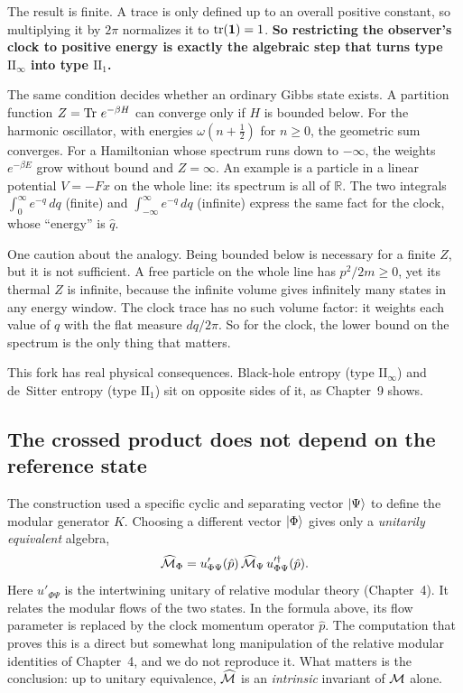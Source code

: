 The result is finite. A trace is only defined up to an overall positive constant, so multiplying it by $2\pi$
normalizes it to $\operatorname{tr}(\mathbf{1})=1$. \textbf{So restricting the observer's clock to positive energy is exactly the
algebraic step that turns type $\mathrm{II}_\infty$ into type $\mathrm{II}_1$.}

The same condition decides whether an ordinary Gibbs state exists. A partition function $Z=\operatorname{Tr}\,e^{-\beta H}$
can converge only if $H$ is bounded below. For the harmonic oscillator, with energies $\omega(n+\tfrac12)$ for
$n\ge0$, the geometric sum converges. For a Hamiltonian whose spectrum runs down to $-\infty$, the weights
$e^{-\beta E}$ grow without bound and $Z=\infty$. An example is a particle in a linear potential $V=-Fx$ on the
whole line: its spectrum is all of $\mathbb R$. The two integrals $\int_0^\infty e^{-q}\,dq$ (finite) and
$\int_{-\infty}^\infty e^{-q}\,dq$ (infinite) express the same fact for the clock, whose ``energy'' is $\hat q$.

One caution about the analogy. Being bounded below is necessary for a finite $Z$, but it is not sufficient. A
free particle on the whole line has $p^2/2m\ge0$, yet its thermal $Z$ is infinite, because the infinite volume
gives infinitely many states in any energy window. The clock trace has no such volume factor: it weights each
value of $q$ with the flat measure $dq/2\pi$. So for the clock, the lower bound on the spectrum is the only
thing that matters.

This fork has real physical consequences. Black-hole entropy (type $\mathrm{II}_\infty$) and de~Sitter entropy
(type $\mathrm{II}_1$) sit on opposite sides of it, as Chapter~9 shows.

\subsection*{The crossed product does not depend on the reference state}

The construction used a specific cyclic and separating vector $\ket\Psi$ to define the modular generator $K$.
Choosing a different vector $\ket\Phi$ gives only a \emph{unitarily equivalent} algebra,
\[
\widehat{\mathcal{M}}_\Phi = u'_{\Phi\Psi}(\hat p)\,\widehat{\mathcal{M}}_\Psi\,u_{\Phi\Psi}'^\dagger(\hat p) .
\]
Here $u'_{\Phi\Psi}$ is the intertwining unitary of relative modular theory (Chapter~4). It relates the
modular flows of the two states. In the formula above, its flow parameter is replaced by the clock momentum
operator $\hat p$. The computation that proves this is a direct but somewhat long manipulation of the relative
modular identities of Chapter~4, and we do not reproduce it. What matters is the conclusion: up to unitary
equivalence, $\widehat{\mathcal{M}}$ is an \emph{intrinsic} invariant of $\mathcal{M}$ alone.

